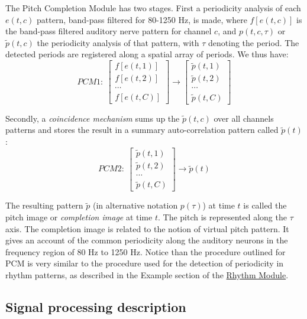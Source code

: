 The Pitch Completion Module has two stages. First a periodicity
analysis of each $e(t,c)$ pattern, band-pass filtered for 80-1250
Hz, is made, where $f[e(t,c)]$ is the band-pass filtered auditory
nerve pattern for channel $c$, and $p(t,c,\tau)$ or
$\tilde{p}(t,c)$ the periodicity analysis of that pattern, with
$\tau$ denoting the period. The detected periods are registered
along a spatial array of periods. We thus have:
\begin{displaymath}
PCM1:~ \left[
\begin{array}{l}
f[e(t,1)] \\ f[e(t,2)] \\ \cdots \\ f[e(t,C)]
\end{array}
\right] \rightarrow \left[
\begin{array}{l}
\tilde{p}(t,1) \\ \tilde{p}(t,2) \\ \cdots \\ \tilde{p}(t,C)
\end{array}
\right]
\end{displaymath}

Secondly, a {\sl coincidence mechanism} sums up the
$\tilde{p}(t,c)$ over all channels patterns and stores the result
in a summary auto-correlation pattern called $\tilde{p}(t)$:
\begin{displaymath}
PCM2:~ \left[
\begin{array}{l}
\tilde{p}(t,1) \\ \tilde{p}(t,2) \\ \cdots \\ \tilde{p}(t,C)
\end{array}
\right] \rightarrow \tilde{p}(t)
\end{displaymath}

The resulting pattern $\tilde{p}$ (in alternative notation
$p(\tau)$) at time $t$ is called the pitch image or {\sl
completion image} at time $t$. The pitch is represented along the
$\tau$ axis. The completion image is related to the notion of
virtual pitch pattern. It gives an account of the common
periodicity along the auditory neurons in the frequency region of
80 Hz to 1250 Hz. Notice than the procedure outlined for PCM is
very similar to the procedure used for the detection of
periodicity in rhythm patterns, as described in the Example
section of the \hyperlink{Concepts:RhythmModule}{Rhythm Module}.

\subsection{Signal processing description}


